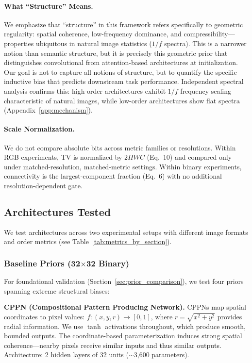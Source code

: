 \documentclass{article}
\begin{document}
\paragraph{What ``Structure'' Means.} We emphasize that ``structure'' in this framework refers specifically to geometric regularity: spatial coherence, low-frequency dominance, and compressibility---properties ubiquitous in natural image statistics ($1/f$ spectra). This is a narrower notion than semantic structure, but it is precisely this geometric prior that distinguishes convolutional from attention-based architectures at initialization. Our goal is not to capture all notions of structure, but to quantify the specific inductive bias that predicts downstream task performance. Independent spectral analysis confirms this: high-order architectures exhibit $1/f$ frequency scaling characteristic of natural images, while low-order architectures show flat spectra (Appendix~\ref{app:mechanism}).

\paragraph{Scale Normalization.} We do not compare absolute bits across metric families or resolutions. Within RGB experiments, TV is normalized by $2HWC$ (Eq.~10) and compared only under matched-resolution, matched-metric settings. Within binary experiments, connectivity is the largest-component fraction (Eq.~6) with no additional resolution-dependent gate.

\subsection{Architectures Tested}

We test architectures across two experimental setups with different image formats and order metrics (see Table~\ref{tab:metrics_by_section}).

\subsubsection{Baseline Priors (32$\times$32 Binary)}

For foundational validation (Section~\ref{sec:prior_comparison}), we test four priors spanning extreme structural biases:

\textbf{CPPN (Compositional Pattern Producing Network).}
CPPNs \cite{stanley2007cppn} map spatial coordinates to pixel values: $f: (x, y, r) \to [0,1]$, where $r = \sqrt{x^2 + y^2}$ provides radial information. We use $\tanh$ activations throughout, which produce smooth, bounded outputs. The coordinate-based parameterization induces strong spatial coherence---nearby pixels receive similar inputs and thus similar outputs. Architecture: 2 hidden layers of 32 units ($\sim$3,600 parameters).
\end{document}
